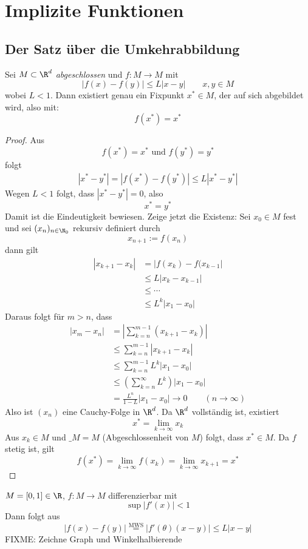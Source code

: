 \documentclass[a4paper,10pt]{scrbook}
\begin{document}
\chapter{Implizite Funktionen}

\section{Der Satz über die Umkehrabbildung}

\begin{st}
\label{14.1}
Sei $M\subset \R^d$ \emph{abgeschlossen} und $f:M\to M$ mit
\[
|f(x)-f(y)| \le L|x-y|	\qquad x,y\in M
\]
wobei $L<1$.
Dann existiert genau ein Fixpunkt $x^*\in M$, der auf sich abgebildet wird, also mit:
\[
f(x^*) = x^*
\]
\begin{proof}
Aus
\[
f(x^*) = x^* \text{ und } f(y^*) = y^*
\]
folgt
\begin{align*}
|x^*-y^*| = |f(x^*)-f(y^*)| \le L|x^* - y^*|
\end{align*}
Wegen $L<1$ folgt, dass $|x^*-y^*|=0$, also
\[
x^*=y^*
\]
Damit ist die Eindeutigkeit bewiesen.
Zeige jetzt die Existenz:
Sei $x_0\in M$ fest und sei $(x_n)_{n\in \N_0}$ rekursiv definiert durch
\[
x_{n+1} := f(x_n)
\]
dann gilt
\begin{align*}
|x_{k+1}-x_k| &= |f(x_k)-f(x_{k-1}|\\
&\le L|x_k -x_{k-1}|\\
&\le \cdots \\
&\le L^k|x_1-x_0|
\end{align*}
Daraus folgt für $m>n$, dass
\begin{align*}
|x_m-x_n| &= \left| \sum_{k=n}^{m-1}(x_{k+1}-x_k)\right|\\
&\le \sum_{k=n}^{m-1}|x_{k+1}-x_k|\\
&\le \sum_{k=n}^{m-1}L^k|x_1-x_0|\\
&\le \left(\sum_{k=n}^{\infty}L^k\right)|x_1-x_0|\\
&= \frac {L^n}{1-L}|x_1-x_0| \to 0 \qquad (n\to \infty)
\end{align*}
Also ist $(x_n)$ eine Cauchy-Folge in $\R^d$.
Da $\R^d$ vollständig ist, existiert
\[
x^* = \lim_{k\to \infty}x_k
\]
Aus $x_k\in M$ und $\_{M}=M$ (Abgeschlossenheit von $M$) folgt, dass $x^*\in M$.
Da $f$ stetig ist, gilt
\[
f(x^*) = \lim_{k\to \infty}f(x_k) =\lim_{k\to \infty}x_{k+1} = x^*
\]
\end{proof}
\end{st}

\begin{ex*}
$M=[0,1]\in \R$, $f:M\to M$ differenzierbar mit
\[
\sup |f'(x)| <1
\]
Dann folgt aus
\[
|f(x)-f(y)| \stackrel{\text{MWS}}= |f'(\theta)(x-y)| \le L|x-y|
\]
FIXME: Zeichne Graph und Winkelhalbierende

\end{ex*}
\end{document}
